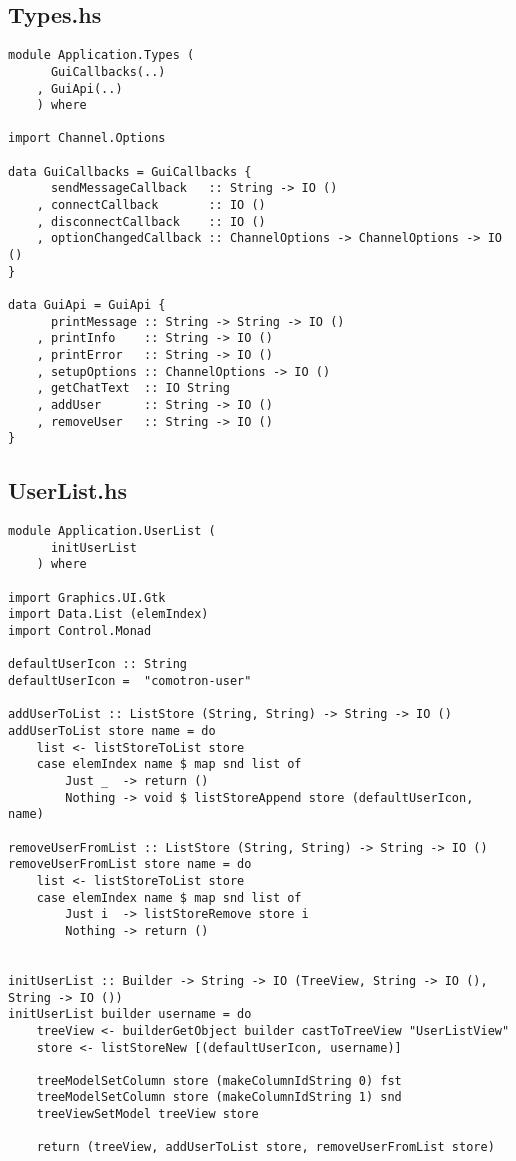\documentclass[russian,utf8,simple,emptystyle]{eskdtext}
\begin{document}
\subsection{Types.hs}
\begin{lstlisting}
module Application.Types (
      GuiCallbacks(..)
    , GuiApi(..)  
    ) where 

import Channel.Options

data GuiCallbacks = GuiCallbacks {
      sendMessageCallback   :: String -> IO ()
    , connectCallback       :: IO ()
    , disconnectCallback    :: IO ()
    , optionChangedCallback :: ChannelOptions -> ChannelOptions -> IO ()
}

data GuiApi = GuiApi {
      printMessage :: String -> String -> IO ()
    , printInfo    :: String -> IO ()
    , printError   :: String -> IO ()
    , setupOptions :: ChannelOptions -> IO ()
    , getChatText  :: IO String
    , addUser      :: String -> IO ()
    , removeUser   :: String -> IO ()
}
\end{lstlisting}

\subsection{UserList.hs}
\begin{lstlisting}
module Application.UserList (
      initUserList
    ) where

import Graphics.UI.Gtk
import Data.List (elemIndex)
import Control.Monad 

defaultUserIcon :: String 
defaultUserIcon =  "comotron-user"

addUserToList :: ListStore (String, String) -> String -> IO ()
addUserToList store name = do
    list <- listStoreToList store 
    case elemIndex name $ map snd list of
        Just _  -> return ()
        Nothing -> void $ listStoreAppend store (defaultUserIcon, name)

removeUserFromList :: ListStore (String, String) -> String -> IO ()
removeUserFromList store name = do 
    list <- listStoreToList store 
    case elemIndex name $ map snd list of
        Just i  -> listStoreRemove store i 
        Nothing -> return ()


initUserList :: Builder -> String -> IO (TreeView, String -> IO (), String -> IO ())
initUserList builder username = do
    treeView <- builderGetObject builder castToTreeView "UserListView"
    store <- listStoreNew [(defaultUserIcon, username)]
    
    treeModelSetColumn store (makeColumnIdString 0) fst 
    treeModelSetColumn store (makeColumnIdString 1) snd 
    treeViewSetModel treeView store 

    return (treeView, addUserToList store, removeUserFromList store)
\end{lstlisting}
\end{document}
